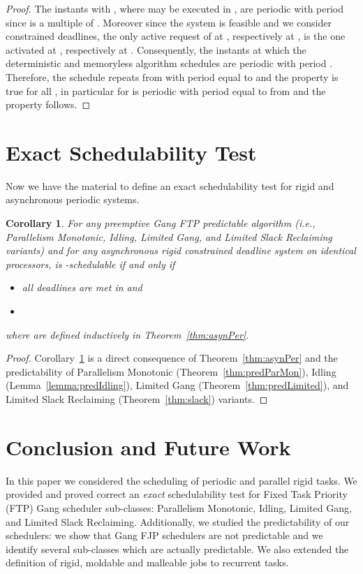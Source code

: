 \documentclass[a4paper]{article}
\newtheorem{corollary}[theorem]{Corollary}
\begin{document}
\begin{proof}
The instants  with , where  may be executed in , are periodic with period  since  is a multiple of .  Moreover since the system is feasible and we consider constrained deadlines, the only active request of  at , respectively at , is the one activated at , respectively at . Consequently, the instants at which the deterministic and memoryless algorithm  schedules  are periodic with period . Therefore, the schedule  repeats from  with period equal to  and the property is true for all , in particular for   is periodic with period equal to  from  and the property follows.
\end{proof}

\section{Exact Schedulability Test}\label{sec:exact}
Now we have the material to define an exact schedulability test for rigid and asynchronous  periodic systems.

\begin{corollary}\label{cor:exact-test} For any preemptive Gang FTP predictable algorithm  (i.e., Parallelism Monotonic, Idling, Limited Gang, and Limited Slack Reclaiming variants) and for any asynchronous rigid constrained deadline system  on  identical processors,  is -schedulable if and only if 
\begin{itemize}
\item all deadlines are met in  and
\item 
\end{itemize}
where  are defined inductively in Theorem~\ref{thm:asynPer}.
\end{corollary}
\begin{proof}
Corollary~\ref{cor:exact-test} is a direct consequence of Theorem~\ref{thm:asynPer} and the predictability of Parallelism Monotonic (Theorem~\ref{thm:predParMon}), Idling (Lemma~\ref{lemma:predIdling}), Limited Gang (Theorem~\ref{thm:predLimited}), and Limited Slack Reclaiming (Theorem~\ref{thm:slack}) variants.
\end{proof}

\section{Conclusion and Future Work}\label{sec:conclusion}
In this paper we considered the scheduling of periodic and parallel rigid tasks. We provided and proved correct an \emph{exact} schedulability test for Fixed Task Priority (FTP) Gang scheduler sub-classes: Parallelism Monotonic, Idling, Limited Gang, and Limited Slack Reclaiming. Additionally, we studied the predictability of our schedulers: we show that Gang FJP schedulers are not predictable and we identify several sub-classes which are actually predictable. We also extended the definition of rigid, moldable and malleable jobs to recurrent tasks. 
\end{document}
